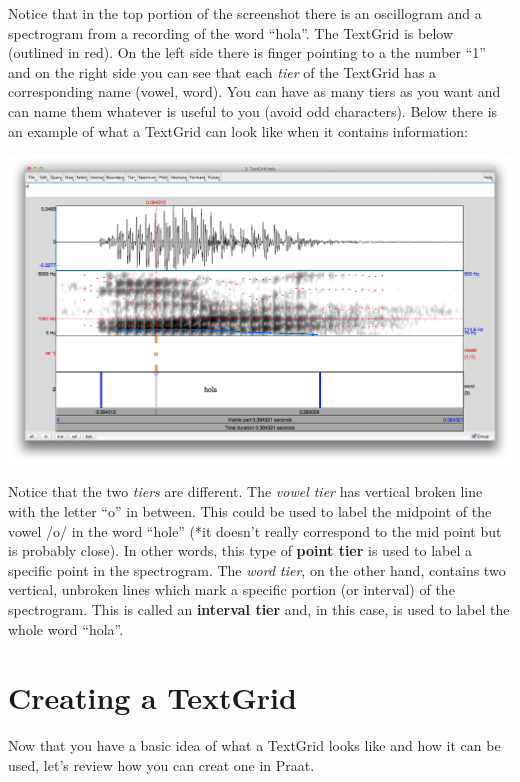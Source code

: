 \documentclass[12pt]{article}
\begin{document}
Notice that in the top portion of the screenshot there is an oscillogram and a spectrogram from a recording of the word ``hola''. The TextGrid is below (outlined in red). On the left side there is finger pointing to a the number ``1'' and on the right side you can see that each \emph{tier} of the TextGrid has a corresponding name (vowel, word). You can have as many tiers as you want and can name them whatever is useful to you (avoid odd characters). Below there is an example of what a TextGrid can look like when it contains information:

\begin{center}
	\includegraphics[scale=.12]{tg2.png}
\end{center}

Notice that the two \emph{tiers} are different. The \emph{vowel tier} has vertical broken line with the letter ``o'' in between. This could be used to label the midpoint of the vowel /o/ in the word ``hole'' (*it doesn't really correspond to the mid point but is probably close). In other words, this type of \textbf{point tier} is used to label a specific point in the spectrogram. The \emph{word tier}, on the other hand, contains two vertical, unbroken lines which mark a specific portion (or interval) of the spectrogram. This is called an \textbf{interval tier} and, in this case, is used to label the whole word ``hola''. 

\section{Creating a TextGrid} %
\label{sec:creating_a_text_grid}

Now that you have a basic idea of what a TextGrid looks like and how it can be used, let's review how you can creat one in Praat. 
\end{document}
